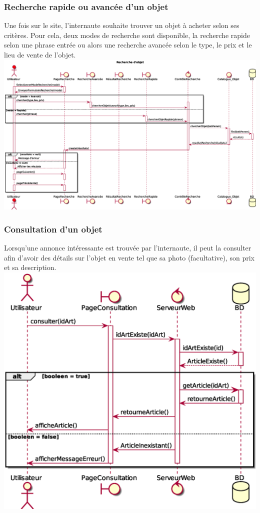 \subsubsection{Recherche rapide ou avancée d'un objet}
Une fois sur le site, l'internaute souhaite trouver un objet à acheter selon ses critères. Pour cela, deux modes de recherche sont disponible, la recherche rapide selon une phrase entrée ou alors une recherche avancée selon le type, le prix et le lieu de vente de l'objet. \\
\includegraphics[width=17cm]{Images/DSEQ_Recherche} \\
\newpage
\subsubsection{Consultation d'un objet}
Lorsqu'une annonce intéressante est trouvée par l'internaute, il peut la consulter afin d'avoir des détails sur l'objet en vente tel que sa photo (facultative), son prix et sa description. \\
\includegraphics[width=17cm]{Images/DSEQ_Consultation} \\
\newpage
